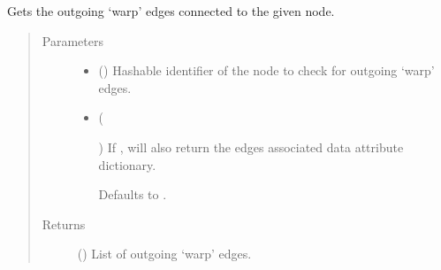 \documentclass[letterpaper,10pt,english]{sphinxmanual}
\begin{document}
\begin{fulllineitems}

\begin{fulllineitems}
\label{\detokenize{cockatoo:cockatoo.KnitDiNetwork.node_warp_edges_out}}
Gets the outgoing ‘warp’ edges connected to the given node.
\begin{quote}\begin{description}
\item[{Parameters}] \leavevmode\begin{itemize}
\item {} 
 () \textendash{} Hashable identifier of the node to check for outgoing ‘warp’ edges.

\item {} 
 (%
\begin{footnote}[151]\sphinxAtStartFootnote
{}
%
\end{footnote}\sphinxstyleliteralemphasis{\sphinxupquote{, }}) \textendash{} 
If , will also return the edges associated data attribute
dictionary.

Defaults to .


\end{itemize}

\item[{Returns}] \leavevmode
{} () \textendash{} List of outgoing ‘warp’ edges.

\end{description}\end{quote}

\end{fulllineitems}



\end{fulllineitems}
\end{document}
